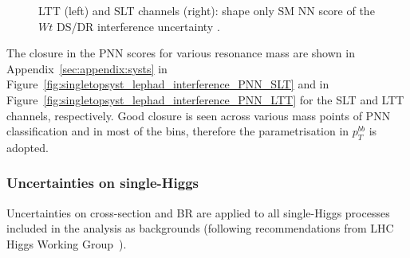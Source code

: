 \begin{figure}
\centering
{}
\caption{LTT (left) and SLT channels (right): shape only SM NN score of the $Wt$ DS/DR interference uncertainty .}
\label{fig:singletopsyst_lephad_interference_NN}
\end{figure}    
The closure in the PNN scores for various resonance mass 
are shown in Appendix~\ref{sec:appendix:systs} in 
Figure~\ref{fig:singletopsyst_lephad_interference_PNN_SLT} 
and in Figure~\ref{fig:singletopsyst_lephad_interference_PNN_LTT}
for the SLT and LTT channels, respectively. 
Good closure is seen across various mass points of PNN classification
and in most of the bins, therefore the parametrisation in $p_T^{bb}$ is adopted.




\subsubsection{Uncertainties on single-Higgs}
\label{sec:DiHiggs:singlehiggssysts}

Uncertainties on cross-section and BR are applied to all single-Higgs 
processes included in the analysis as backgrounds 
(following recommendations from LHC Higgs Working Group~\cite{dihiggs-twiki}). 

